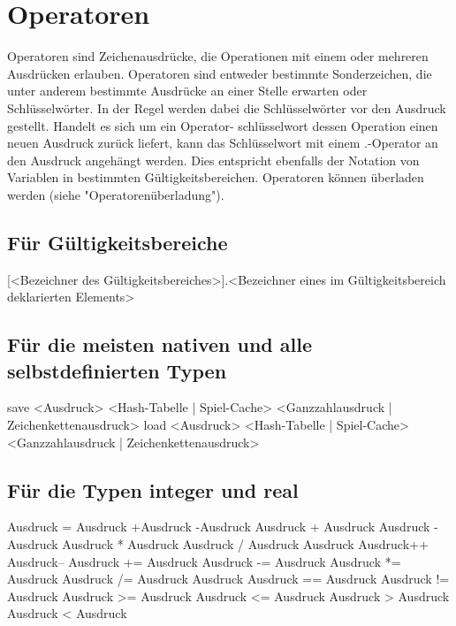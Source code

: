 \chapter{Operatoren}
Operatoren sind Zeichenausdrücke, die Operationen mit einem oder mehreren Ausdrücken erlauben.
Operatoren sind entweder bestimmte Sonderzeichen, die unter anderem bestimmte Ausdrücke an einer Stelle
erwarten oder Schlüsselwörter.
In der Regel werden dabei die Schlüsselwörter vor den Ausdruck gestellt. Handelt es sich um ein Operator-
schlüsselwort dessen Operation einen neuen Ausdruck zurück liefert, kann das Schlüsselwort mit einem .-Operator
an den Ausdruck angehängt werden.
Dies entspricht ebenfalls der Notation von Variablen in bestimmten Gültigkeitsbereichen.
Operatoren können überladen werden (siehe "Operatorenüberladung").

\section{Für Gültigkeitsbereiche}
[<Bezeichner des Gültigkeitsbereiches>].<Bezeichner eines im Gültigkeitsbereich deklarierten Elements>

\section{Für die meisten nativen und alle selbstdefinierten Typen}
save <Ausdruck> <Hash-Tabelle | Spiel-Cache> <Ganzzahlausdruck | Zeichenkettenausdruck>
load <Ausdruck> <Hash-Tabelle | Spiel-Cache> <Ganzzahlausdruck | Zeichenkettenausdruck>

\section{Für die Typen integer und real}
Ausdruck = Ausdruck
+Ausdruck
-Ausdruck
Ausdruck + Ausdruck
Ausdruck - Ausdruck
Ausdruck * Ausdruck
Ausdruck / Ausdruck
Ausdruck %
Ausdruck++
Ausdruck--
Ausdruck += Ausdruck
Ausdruck -= Ausdruck
Ausdruck *= Ausdruck
Ausdruck /= Ausdruck
Ausdruck %
Ausdruck == Ausdruck
Ausdruck != Ausdruck
Ausdruck >= Ausdruck
Ausdruck <= Ausdruck
Ausdruck > Ausdruck
Ausdruck < Ausdruck

